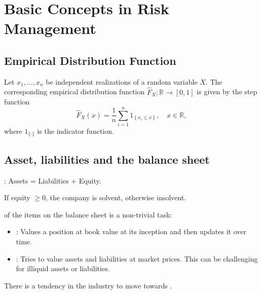 \section{Basic Concepts in Risk Management}
\subsection*{Empirical Distribution Function}
Let $x_{1}, \ldots, x_{n}$ be independent realizations of a random variable $X$. The corresponding empirical distribution function $\hat{F}_{X}: \mathbb{R} \rightarrow[0,1]$ is given by the step function
$$
\hat{F}_{X}(x)=\frac{1}{n} \sum_{i=1}^{n} 1_{\left\{x_{i} \leq x\right\}}, \quad x \in \mathbb{R},
$$
where $1_{\{\cdot\}}$ is the indicator function.



\subsection*{Asset, liabilities and the balance sheet}
: Assets = Liabilities + Equity.

If equity $\geq 0$, the company is solvent, otherwise insolvent.


 of the items on the balance sheet is a non-trivial task:
\begin{itemize}[leftmargin=*]
    \item {}:
Values a position at book value at its inception and then updates it over time.
    \item {}: 
Tries to value assets and liabilities at market prices. This can be challenging for illiquid assets or liabilities.
\end{itemize}
There is a tendency in the industry to move towards .




